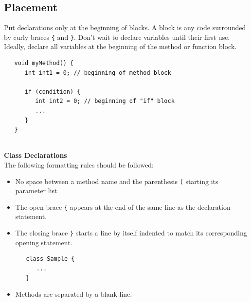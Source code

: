 \documentclass{CSSRforAfrica}
\newcommand{\blank}{~\\}
\begin{document}
\begin{appendices}
\subsection{Placement}
Put declarations only at the beginning of blocks. A block is any code surrounded by curly
braces {\small \verb+{+} and {\small \verb+}+}. 
Don't wait to declare variables until their first use. 
Ideally, declare all variables at the beginning of the method or function block.
{\small
\begin{verbatim}
   void myMethod() {
      int int1 = 0; // beginning of method block
  
      if (condition) {
         int int2 = 0; // beginning of "if" block
         ...
      }
   }
\end{verbatim}
}
\blank
{\bf Class Declarations}\\
The following formatting rules should be followed:
\begin{itemize}
\item No space between a method name and the parenthesis {\small \verb+(+} starting its parameter list.
\item The open brace {\small \verb+{+}  appears at the end of the same line as the declaration statement.
\item The closing brace {\small \verb+}+} starts a line by itself indented to match its corresponding opening
statement.
{\small
\begin{verbatim}
   class Sample {  
      ...
   }
\end{verbatim}
}
\item Methods are separated by a blank line.
\end{itemize}


\end{appendices}
\end{document}
